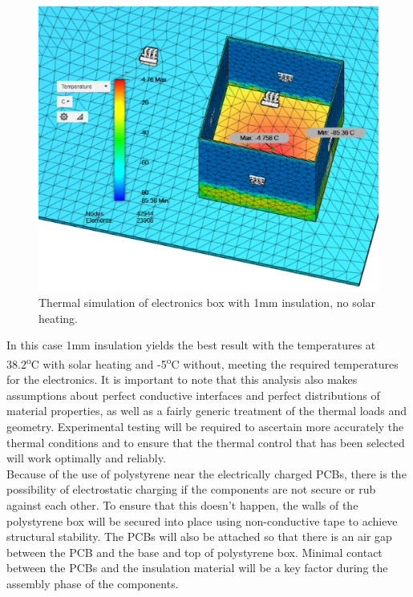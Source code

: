 	\begin{figure}[H]
    \centering  
    \includegraphics[scale=0.65]{4-experiment-design/img/mechanical/1mmthicknoheat.PNG}
	\caption{Thermal simulation of electronics box with 1mm insulation, no solar heating.}
	\label{fig:1mmthicknoheat}    
    	\end{figure}
	
In this case 1mm insulation yields the best result with the temperatures at 38.2\textsuperscript{o}C with solar heating and -5\textsuperscript{o}C without, meeting the required temperatures for the electronics. It is important to note that this analysis also makes assumptions about perfect conductive interfaces and perfect distributions of material properties, as well as a fairly generic treatment of the thermal loads and geometry. Experimental testing will be required to ascertain more accurately the thermal conditions and to ensure that the thermal control that has been selected will work optimally and reliably.\\

Because of the use of polystyrene near the electrically charged PCBs, there is the possibility of electrostatic charging if the components are not secure or rub against each other. To ensure that this doesn't happen, the walls of the polystyrene box will be secured into place using non-conductive tape to achieve structural stability. The PCBs will also be attached so that there is an air gap between the PCB and the base and top of polystyrene box. Minimal contact between the PCBs and the insulation material will be a key factor during the assembly phase of the components.


